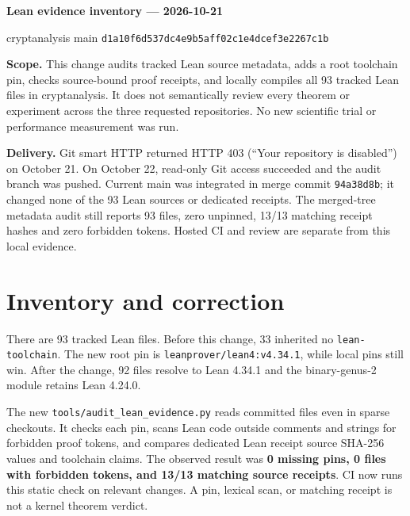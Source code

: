 \documentclass[10pt]{article}
\newcommand{\mono}[1]{\texttt{#1}}
\begin{document}
\begin{center}
{\Large\bfseries Lean evidence inventory --- 2026-10-21}\par
{\small cryptanalysis main \mono{d1a10f6d537dc4e9b5aff02c1e4dcef3e2267c1b}}
\end{center}

\textbf{Scope.} This change audits tracked Lean source metadata, adds a root
toolchain pin, checks source-bound proof receipts, and locally compiles all 93
tracked Lean files in cryptanalysis. It does not semantically review every
theorem or experiment across the three requested repositories. No new
scientific trial or performance measurement was run.

\textbf{Delivery.} Git smart HTTP returned HTTP 403 (``Your repository is
disabled'') on October 21. On October 22, read-only Git access succeeded and
the audit branch was pushed. Current main was integrated in merge commit
\mono{94a38d8b}; it changed none of the 93 Lean sources or dedicated receipts.
The merged-tree metadata audit still reports 93 files, zero unpinned, 13/13
matching receipt hashes and zero forbidden tokens. Hosted CI and review are
separate from this local evidence.

\section*{Inventory and correction}
There are 93 tracked Lean files. Before this change, 33 inherited no
\mono{lean-toolchain}. The new root pin is \mono{leanprover/lean4:v4.34.1},
while local pins still win. After the change, 92 files resolve to Lean 4.34.1
and the binary-genus-2 module retains Lean 4.24.0.

The new \mono{tools/audit\_lean\_evidence.py} reads committed files even in
sparse checkouts. It checks each pin, scans Lean code outside comments and
strings for forbidden proof tokens, and compares dedicated Lean receipt
source SHA-256 values and toolchain claims. The observed result was
\textbf{0 missing pins, 0 files with forbidden tokens, and 13/13 matching
source receipts}. CI now runs this static check on relevant changes. A pin,
lexical scan, or matching receipt is not a kernel theorem verdict.

\begin{center}
\end{center}
\end{document}
